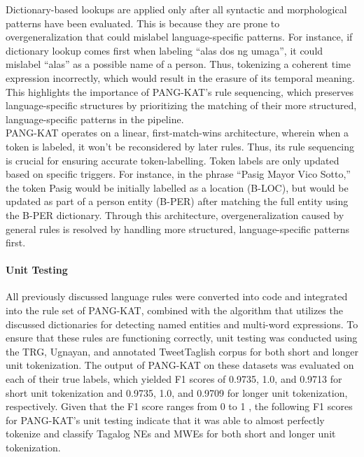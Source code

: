\documentclass[journal]{./IEEE/IEEEtran}
\begin{document}
Dictionary-based lookups are applied only after all syntactic and morphological patterns have been evaluated. This is because they are prone to overgeneralization that could mislabel language-specific patterns. For instance, if dictionary lookup comes first when labeling “alas dos ng umaga”, it could mislabel “alas” as a possible name of a person. Thus, tokenizing a coherent time expression incorrectly, which would result in the erasure of its temporal meaning. This highlights the importance of PANG-KAT’s rule sequencing, which preserves language-specific structures by prioritizing the matching of their more structured, language-specific patterns in the pipeline. \\

PANG-KAT operates on a linear, first-match-wins architecture, wherein when a token is labeled, it won’t be reconsidered by later rules. Thus, its rule sequencing is crucial for ensuring accurate token-labelling. Token labels are only updated based on specific triggers. For instance, in the phrase “Pasig Mayor Vico Sotto,” the token Pasig would be initially labelled as a location (B-LOC), but would be updated as part of a person entity (B-PER) after matching the full entity using the B-PER dictionary. Through this architecture, overgeneralization caused by general rules is resolved by handling more structured, language-specific patterns first. \\

\paragraph{Unit Testing}

All previously discussed language rules were converted into code and integrated into the rule set of PANG-KAT, combined with the algorithm that utilizes the discussed dictionaries for detecting named entities and multi-word expressions. To ensure that these rules are functioning correctly, unit testing was conducted using the TRG, Ugnayan, and annotated TweetTaglish corpus for both short and longer unit tokenization. The output of PANG-KAT on these datasets was evaluated on each of their true labels, which yielded F1 scores of 0.9735, 1.0, and 0.9713 for short unit tokenization and 0.9735, 1.0, and 0.9709 for longer unit tokenization, respectively. Given that the F1 score ranges from 0 to 1 {\cite{perEvalMetrics}}, the following F1 scores for PANG-KAT’s unit testing indicate that it was able to almost perfectly tokenize and classify Tagalog NEs and MWEs for both short and longer unit tokenization. \\
\end{document}
